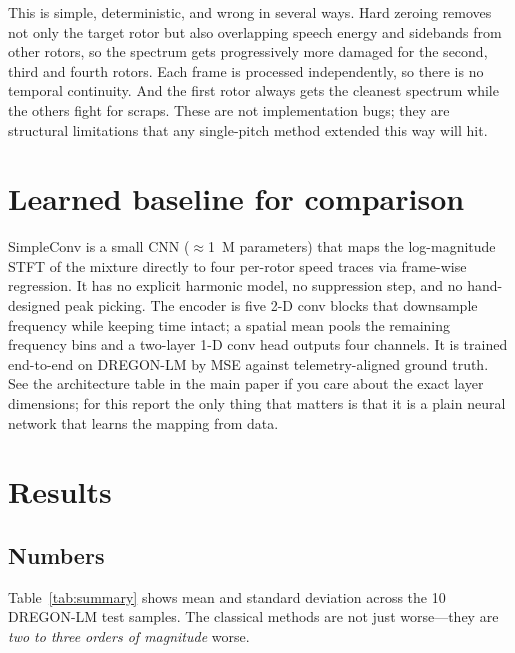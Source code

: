 \documentclass[11pt,a4paper]{article}
\begin{document}
This is simple, deterministic, and wrong in several ways.  Hard zeroing removes
not only the target rotor but also overlapping speech energy and sidebands from
other rotors, so the spectrum gets progressively more damaged for the second,
third and fourth rotors.  Each frame is processed independently, so there is no
temporal continuity.  And the first rotor always gets the cleanest spectrum while
the others fight for scraps.  These are not implementation bugs; they are
structural limitations that any single-pitch method extended this way will hit.

\section{Learned baseline for comparison}

SimpleConv is a small CNN ($\approx$1~M parameters) that maps the
log-magnitude STFT of the mixture directly to four per-rotor speed traces via
frame-wise regression.  It has no explicit harmonic model, no suppression step,
and no hand-designed peak picking.  The encoder is five 2-D conv blocks that
downsample frequency while keeping time intact; a spatial mean pools the
remaining frequency bins and a two-layer 1-D conv head outputs four channels.  It
is trained end-to-end on DREGON-LM by MSE against telemetry-aligned ground
truth.  See the architecture table in the main paper if you care about the exact
layer dimensions; for this report the only thing that matters is that it is a
plain neural network that learns the mapping from data.

\section{Results}

\subsection{Numbers}

Table~\ref{tab:summary} shows mean and standard deviation across the 10
DREGON-LM test samples.  The classical methods are not just worse---they are
\emph{two to three orders of magnitude} worse.
\end{document}

